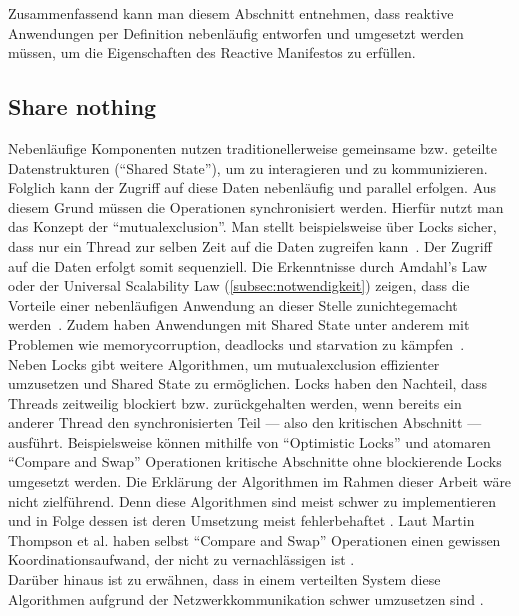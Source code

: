 Zusammenfassend kann man diesem Abschnitt entnehmen, dass reaktive Anwendungen per Definition nebenläufig entworfen und umgesetzt werden müssen, um die Eigenschaften des Reactive Manifestos zu erfüllen.

\pagebreak

\subsection{Share nothing}\label{subsec:sharenothing}
Nebenläufige Komponenten nutzen traditionellerweise gemeinsame bzw. geteilte Datenstrukturen (\enquote{Shared State}), um zu interagieren und zu kommunizieren. Folglich kann der Zugriff auf diese Daten nebenläufig und parallel erfolgen. Aus diesem Grund müssen die Operationen synchronisiert werden. Hierfür nutzt man das Konzept der \enquote{\gls{mutualexclusion}}. Man stellt beispielsweise über Locks sicher, dass nur ein Thread zur selben Zeit auf die Daten zugreifen kann~\cite[S.~10]{butcher_seven_2014}. Der Zugriff auf die Daten erfolgt somit sequenziell. Die Erkenntnisse durch Amdahl's Law oder der Universal Scalability Law (\ref{subsec:notwendigkeit}) zeigen, dass die Vorteile einer nebenläufigen Anwendung an dieser Stelle zunichtegemacht werden~\cite[S.~45]{kuhn_reactive_2015}. Zudem haben Anwendungen mit Shared State unter anderem mit Problemen wie \gls{memorycorruption}, \glspl{deadlock} und \gls{starvation} zu kämpfen~\cite[S.~117]{vernon_reactive_2016}.\\
Neben Locks gibt weitere Algorithmen, um \gls{mutualexclusion} effizienter umzusetzen und Shared State zu ermöglichen. Locks haben den Nachteil, dass Threads zeitweilig blockiert bzw. zurückgehalten werden, wenn bereits ein anderer Thread den synchronisierten Teil --- also den kritischen Abschnitt --- ausführt. Beispielsweise können mithilfe von \enquote{Optimistic Locks} und atomaren \enquote{Compare and Swap} Operationen kritische Abschnitte ohne blockierende Locks umgesetzt werden. Die Erklärung der Algorithmen im Rahmen dieser Arbeit wäre nicht zielführend. Denn diese Algorithmen sind meist schwer zu implementieren und in Folge dessen ist deren Umsetzung meist fehlerbehaftet \cite{jenkov_non-blocking_2015}. Laut Martin Thompson et al. haben selbst \enquote{Compare and Swap} Operationen einen gewissen Koordinationsaufwand, der nicht zu vernachlässigen ist \cite{thompson_disruptor_2011}.\\
Darüber hinaus ist zu erwähnen, dass in einem verteilten System diese Algorithmen aufgrund der Netzwerkkommunikation schwer umzusetzen sind \cite[S.~45]{butcher_seven_2014}.\\

